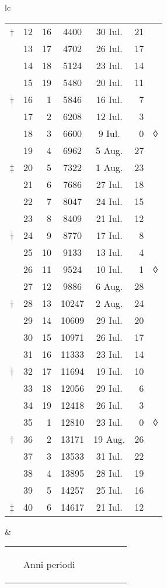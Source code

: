 \begin{tabular}{lc}
\begin{tabular}[t]{r rrccr l}
† & 12 & 16 & 4400 & 30 Iul. & 21 \\
\cline{2-6}
~ & 13 & 17 & 4702 & 26 Iul. & 17 \\
~ & 14 & 18 & 5124 & 23 Iul. & 14 \\
~ & 15 & 19 & 5480 & 20 Iul. & 11 \\
† & 16 &  1 & 5846 & 16 Iul. &  7 \\
\cline{2-6}
~ & 17 &  2 & 6208 & 12 Iul. &  3 \\
~ & 18 &  3 & 6600 &  9 Iul. &  0 & ◊\\
~ & 19 &  4 & 6962 &  5 Aug. & 27 \\
‡ & 20 &  5 & 7322 &  1 Aug. & 23 \\
\cline{2-6}
~ & 21 &  6 & 7686 & 27 Iul. & 18 \\
~ & 22 &  7 & 8047 & 24 Iul. & 15 \\
~ & 23 &  8 & 8409 & 21 Iul. & 12 \\
† & 24 &  9 & 8770 & 17 Iul. &  8 \\
\cline{2-6}
~ & 25 & 10 &  9133 & 13 Iul. &  4 \\
~ & 26 & 11 &  9524 & 10 Iul. &  1 & ◊ \\
~ & 27 & 12 &  9886 &  6 Aug. & 28 \\
† & 28 & 13 & 10247 &  2 Aug. & 24 \\
\cline{2-6}
~ & 29 & 14 & 10609 & 29 Iul. & 20 \\
~ & 30 & 15 & 10971 & 26 Iul. & 17 \\
~ & 31 & 16 & 11333 & 23 Iul. & 14 \\
† & 32 & 17 & 11694 & 19 Iul. & 10 \\
\cline{2-6}
~ & 33 & 18 & 12056 & 29 Iul. &  6 \\
~ & 34 & 19 & 12418 & 26 Iul. &  3 \\
~ & 35 &  1 & 12810 & 23 Iul. &  0 & ◊ \\
† & 36 &  2 & 13171 & 19 Aug. & 26 \\
\cline{2-6}
~ & 37 &  3 & 13533 & 31 Iul. & 22 \\
~ & 38 &  4 & 13895 & 28 Iul. & 19 \\
~ & 39 &  5 & 14257 & 25 Iul. & 16 \\
‡ & 40 &  6 & 14617 & 21 Iul. & 12 \\
\cline{2-6}
\end{tabular}
&
\begin{tabular}[t]{r rrccr l}
~ &
\begin{rotate}{60}Anni periodi\end{rotate} &

\end{tabular}
\end{tabular}
